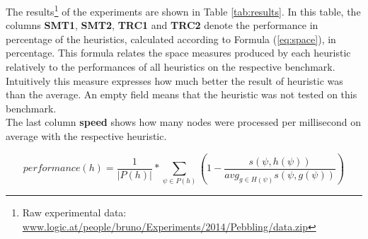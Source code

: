 \documentclass{llncs}
\begin{document}
The results\footnote{Raw experimental data: \url{www.logic.at/people/bruno/Experiments/2014/Pebbling/data.zip}} of the experiments are shown in Table \ref{tab:results}. In this table, the columns \textbf{SMT1}, \textbf{SMT2}, \textbf{TRC1} and \textbf{TRC2} denote the performance in percentage of the heuristics, calculated according to Formula (\ref{eq:space}), in percentage. This formula relates the space measures produced by each heuristic relatively to the performances of all heuristics on the respective benchmark. Intuitively this measure expresses how much better the result of heuristic was than the average. An empty field means that the heuristic was not tested on this benchmark.\\
The last column \textbf{speed} shows how many nodes were processed per millisecond on average with the respective heuristic.

\begin{equation} \label{eq:space}
  \mathit{performance}(h) = \frac{1}{|P(h)|} * \sum_{\psi \in P(h)}{\left( 1 -
    \frac{
      s(\psi,h(\psi))
    }{
        \mathit{avg}_{g\in H(\psi)}{s(\psi,g(\psi))}
    } \right)
  }
\end{equation}
\end{document}
